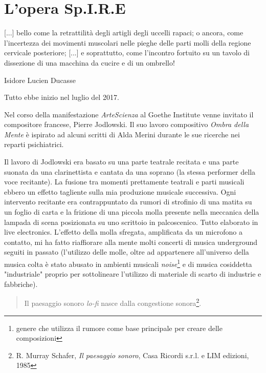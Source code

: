 
\chapter{L'opera Sp.I.R.E}
\label{chp:L'opera Sp.I.R.E}

\epigraph{[...] bello come la retrattilità degli artigli degli uccelli rapaci; o ancora, come l'incertezza dei movimenti muscolari nelle pieghe delle parti molli della regione cervicale posteriore; [...] e soprattutto, come l'incontro fortuito su un tavolo di dissezione di una macchina da cucire e di un ombrello!}{Isidore Lucien Ducasse}

Tutto ebbe inizio nel luglio del 2017.

Nel corso della manifestazione \textit{ArteScienza} al Goethe Institute venne invitato il compositore francese, Pierre Jodlowski. Il suo lavoro compositivo \textit{Ombra della Mente} è ispirato ad alcuni scritti di Alda Merini durante le sue ricerche nei reparti psichiatrici.

Il lavoro di Jodlowski era basato su una parte teatrale recitata e una parte suonata da una clarinettista e cantata da una soprano (la stessa performer della voce recitante). La fusione tra momenti prettamente teatrali e parti musicali ebbero un effetto tagliente sulla mia produzione musicale successiva. Ogni intervento recitante era contrappuntato da rumori di strofinio di una matita su un foglio di carta e la frizione di una piccola molla presente nella meccanica della lampada di scena posizionata su uno scrittoio in palcoscenico. Tutto elaborato in live electronics. L'effetto della molla sfregata, amplificata da un microfono a contatto, mi ha fatto riaffiorare alla mente molti concerti di musica underground seguiti in passato (l'utilizzo delle molle, oltre ad appartenere all'universo della musica colta è stato abusato in ambienti musicali \textit{noise}\footnote{genere che utilizza il rumore come base principale per creare delle composizioni} e di musica cosiddetta "industriale" proprio per sottolineare l'utilizzo di materiale di scarto di industrie e fabbriche).

\begin{quotation}
Il paesaggio sonoro \textit{lo-fi} nasce dalla congestione sonora\footnote{R. Murray Schafer, \textit{Il paesaggio sonoro}, Casa Ricordi s.r.l. e LIM edizioni, 1985}.
\end{quotation}

